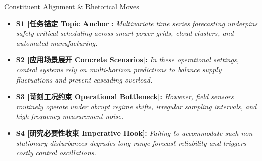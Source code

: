 \begin{TipBox}{Constituent Alignment \& Rhetorical Moves}
\begin{itemize}[leftmargin=1.5em]
  \item \textbf{S1 [任务锚定 Topic Anchor]:} \textit{Multivariate time series forecasting underpins safety-critical scheduling across smart power grids, cloud clusters, and automated manufacturing.}\par{}
  \item \textbf{S2 [应用场景展开 Concrete Scenarios]:} \textit{In these operational settings, control systems rely on multi-horizon predictions to balance supply fluctuations and prevent cascading overload.}\par{}
  \item \textbf{S3 [苛刻工况约束 Operational Bottleneck]:} \textit{However, field sensors routinely operate under abrupt regime shifts, irregular sampling intervals, and high-frequency measurement noise.}\par{}
  \item \textbf{S4 [研究必要性收束 Imperative Hook]:} \textit{Failing to accommodate such non-stationary disturbances degrades long-range forecast reliability and triggers costly control oscillations.}\par{}
\end{itemize}
\end{TipBox}
\bigskip

